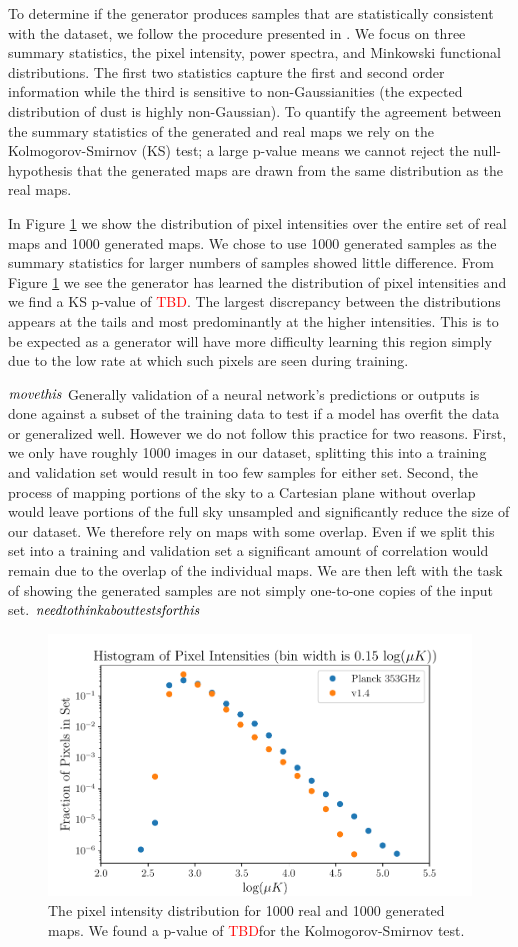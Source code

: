 \documentclass[twocolumn]{aastex62}
\def\tbd{\textcolor{red}{TBD}}
\begin{document}
To determine if the generator produces samples that are statistically consistent with the dataset, we follow the procedure presented in \cite{mustafa17}. We focus on three summary statistics, the pixel intensity, power spectra, and Minkowski functional distributions. The first two statistics capture the first and second order information while the third is sensitive to  non-Gaussianities (the expected distribution of dust is highly non-Gaussian). To quantify the agreement between the summary statistics of the generated and real maps we rely on the Kolmogorov-Smirnov (KS) test; a large p-value means we cannot reject the null-hypothesis that the generated maps are drawn from the same distribution as the real maps.

In Figure \ref{fig:pix_int} we show the distribution of pixel intensities over the entire set of real maps and 1000 generated maps. We chose to use 1000 generated samples as the summary statistics for larger numbers of samples showed little difference. From Figure \ref{fig:pix_int} we see the generator has learned the distribution of pixel intensities and we find a KS p-value of \tbd. The largest discrepancy between the distributions appears at the tails and most predominantly at the higher intensities. This is to be expected as a generator will have more difficulty learning this region simply due to the low rate at which such pixels are seen during training. 

$\it{move this}$
Generally validation of a neural network's predictions or outputs is done against a subset of the training data to test if a model has overfit the data or generalized well. However we do not follow this practice for two reasons. First, we only have roughly 1000 images in our dataset, splitting this into a training and validation set would result in too few samples for either set. Second, the process of mapping portions of the sky to a Cartesian plane without overlap would leave portions of the full sky unsampled and significantly reduce the size of our dataset. We therefore rely on maps with some overlap. Even if we split this set into a training and validation set a significant amount of correlation would remain due to the overlap of the individual maps. We are then left with the task of showing the generated samples are not simply one-to-one copies of the input set. $\it{need to think about tests for this}$

\begin{figure}
\includegraphics[width = .5\textwidth]{HistPixIntensity.pdf}
\caption{The pixel intensity distribution for 1000 real and 1000 generated maps. We found a p-value of \tbd for the Kolmogorov-Smirnov test.}
\label{fig:pix_int}
\end{figure}
\end{document}

